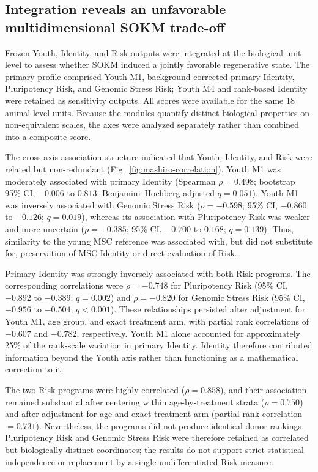
\subsection{Integration reveals an unfavorable multidimensional SOKM trade-off}
\label{sec:integration-tradeoffs}

Frozen Youth, Identity, and Risk outputs were integrated at the biological-unit
level to assess whether SOKM induced a jointly favorable regenerative state.
The primary profile comprised Youth M1, background-corrected primary Identity,
Pluripotency Risk, and Genomic Stress Risk; Youth M4 and rank-based Identity
were retained as sensitivity outputs. All scores were available for the same 18
animal-level units. Because the modules quantify distinct biological
properties on non-equivalent scales, the axes were analyzed separately rather
than combined into a composite score.

The cross-axis association structure indicated that Youth, Identity, and Risk
were related but non-redundant (Fig.~\ref{fig:mashiro-correlation}). Youth M1
was moderately associated with primary Identity (Spearman $\rho=0.498$;
bootstrap 95\% CI, $-0.006$ to $0.813$; Benjamini--Hochberg-adjusted
$q=0.051$). Youth M1 was inversely associated with Genomic Stress Risk
($\rho=-0.598$; 95\% CI, $-0.860$ to $-0.126$; $q=0.019$), whereas its
association with Pluripotency Risk was weaker and more uncertain
($\rho=-0.385$; 95\% CI, $-0.700$ to $0.168$; $q=0.139$). Thus, similarity
to the young MSC reference was associated with, but did not substitute for,
preservation of MSC Identity or direct evaluation of Risk.

Primary Identity was strongly inversely associated with both Risk programs.
The corresponding correlations were $\rho=-0.748$ for Pluripotency Risk
(95\% CI, $-0.892$ to $-0.389$; $q=0.002$) and $\rho=-0.820$ for Genomic
Stress Risk (95\% CI, $-0.956$ to $-0.504$; $q<0.001$). These relationships
persisted after adjustment for Youth M1, age group, and exact treatment arm,
with partial rank correlations of $-0.607$ and $-0.782$, respectively. Youth
M1 alone accounted for approximately 25\% of the rank-scale variation in
primary Identity. Identity therefore contributed information beyond the Youth
axis rather than functioning as a mathematical correction to it.

The two Risk programs were highly correlated ($\rho=0.858$), and their
association remained substantial after centering within age-by-treatment
strata ($\rho=0.750$) and after adjustment for age and exact treatment arm
(partial rank correlation $=0.731$). Nevertheless, the programs did not
produce identical donor rankings. Pluripotency Risk and Genomic Stress Risk
were therefore retained as correlated but biologically distinct coordinates;
the results do not support strict statistical independence or replacement by a
single undifferentiated Risk measure.

